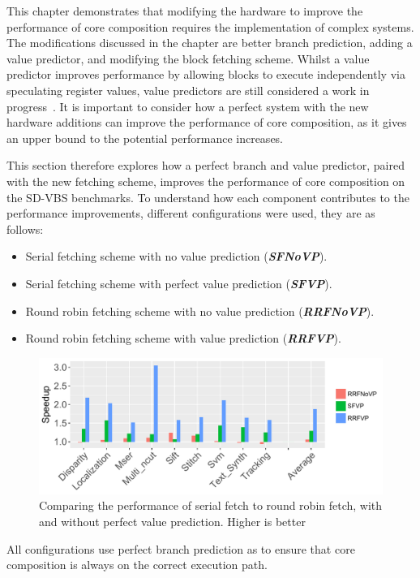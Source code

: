 \newcommand{\novp}{\textit{\textbf{SFNoVP}}}
\newcommand{\vp}{\textit{\textbf{SFVP}}}
\newcommand{\nfnovp}{\textit{\textbf{RRFNoVP}}}
\newcommand{\nfvp}{\textit{\textbf{RRFVP}}}

\newcommand{\optvp}{\textit{\textbf{OptVP}}}
\newcommand{\vt}{\textit{\textbf{VT}}}
\newcommand{\nfvt}{\textit{\textbf{RFVT}}}
\vspace{-1em}

This chapter demonstrates that modifying the hardware to improve the performance of core composition requires the implementation of complex systems.
The modifications discussed in the chapter are better branch prediction, adding a value predictor, and modifying the block fetching scheme.
Whilst a value predictor improves performance by allowing blocks to execute independently via speculating register values, value predictors are still considered a work in progress~\cite{peraisBeBop2015}.
It is important to consider how a perfect system with the new hardware additions can improve the performance of core composition, as it gives an upper bound to the potential performance increases.

This section therefore explores how a perfect branch and value predictor, paired with the new fetching scheme, improves the performance of core composition on the SD-VBS benchmarks.
To understand how each component contributes to the performance improvements, different configurations were used, they are as follows:
\begin{itemize}
\item Serial fetching scheme with no value prediction (\novp).
\vspace{-1em}
\item Serial fetching scheme with perfect value prediction (\vp).
\vspace{-1em}
\item Round robin fetching scheme with no value prediction (\nfnovp).
\vspace{-1em}
\item Round robin fetching scheme with value prediction (\nfvp).
\end{itemize}

\begin{figure}[t]
    \centering
    \includegraphics[width=1\textwidth]{chapter3/graphics/tempres4.pdf}
    \caption{Comparing the performance of serial fetch to round robin fetch, with and without perfect value prediction. Higher is better}
    \label{fig:perf_pred}
\end{figure}
All configurations use perfect branch prediction as to ensure that core composition is always on the correct execution path.

